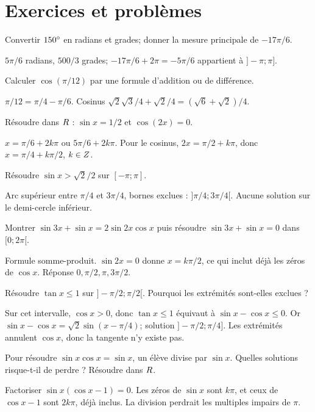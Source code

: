 \section{Exercices et problèmes}
\label{t11s-c16-e01}
Convertir $150^{\circ}$ en radians et grades; donner la mesure principale de $-17\pi/6$.
\begin{corrige}\label{sol-t11s-c16-e01}
$5\pi/6$ radians, $500/3$ grades; $-17\pi/6+2\pi=-5\pi/6$ appartient à $]-\pi;\pi]$.
\end{corrige}
\label{t11s-c16-e02}
Calculer $\cos(\pi/12)$ par une formule d’addition ou de différence.
\begin{corrige}\label{sol-t11s-c16-e02}
$\pi/12=\pi/4-\pi/6$. Cosinus $\sqrt2\sqrt3/4+\sqrt2/4=(\sqrt6+\sqrt2)/4$.
\end{corrige}
\exo[Équations]\label{t11s-c16-e03}
Résoudre dans $R$ : $\sin x=1/2$ et $\cos(2x)=0$.
\begin{corrige}\label{sol-t11s-c16-e03}
$x=\pi/6+2k\pi$ ou $5\pi/6+2k\pi$. Pour le cosinus, $2x=\pi/2+k\pi$, donc $x=\pi/4+k\pi/2$, $k\in Z$.
\end{corrige}
\exo[Inéquation]\label{t11s-c16-e04}
Résoudre $\sin x>\sqrt2/2$ sur $[-\pi;\pi]$.
\begin{corrige}\label{sol-t11s-c16-e04}
Arc supérieur entre $\pi/4$ et $3\pi/4$, bornes exclues : $]\pi/4;3\pi/4[$. Aucune solution sur le demi-cercle inférieur.
\end{corrige}
\exo[Transformer]\label{t11s-c16-e05}
Montrer $\sin3x+\sin x=2\sin2x\cos x$ puis résoudre $\sin3x+\sin x=0$ dans $[0;2\pi[$.
\begin{corrige}\label{sol-t11s-c16-e05}
Formule somme-produit. $\sin2x=0$ donne $x=k\pi/2$, ce qui inclut déjà les zéros de $\cos x$. Réponse $0,\pi/2,\pi,3\pi/2$.
\end{corrige}
\exo[Tangente]\label{t11s-c16-e06}
Résoudre $\tan x\le1$ sur $]-\pi/2;\pi/2[$. Pourquoi les extrémités sont-elles exclues ?
\begin{corrige}\label{sol-t11s-c16-e06}
Sur cet intervalle, $\cos x>0$, donc $\tan x\le1$ équivaut à $\sin x-\cos x\le0$. Or $\sin x-\cos x=\sqrt2\sin(x-\pi/4)$; solution $]-\pi/2;\pi/4]$. Les extrémités annulent $\cos x$, donc la tangente n’y existe pas.
\end{corrige}
\label{t11s-c16-e07}
Pour résoudre $\sin x\cos x=\sin x$, un élève divise par $\sin x$. Quelles solutions risque-t-il de perdre ? Résoudre dans $R$.
\begin{corrige}\label{sol-t11s-c16-e07}
Factoriser $\sin x(\cos x-1)=0$. Les zéros de $\sin x$ sont $k\pi$, et ceux de $\cos x-1$ sont $2k\pi$, déjà inclus. La division perdrait les multiples impairs de $\pi$.
\end{corrige}

